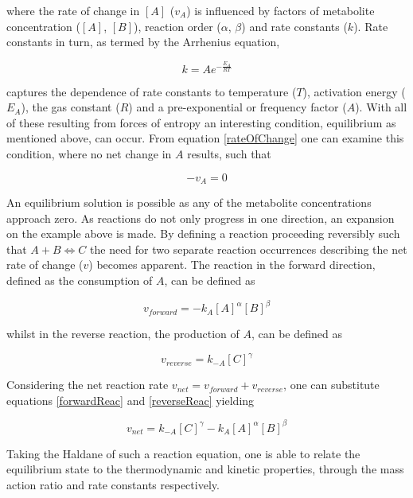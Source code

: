 where the rate of change in $[A]$  ($v_A$) is influenced by factors of metabolite concentration ($[A]$, $[B]$), reaction order ($\alpha$, $\beta$) and rate constants ($k$). Rate constants in turn, as termed by the Arrhenius equation,

\begin{equation}\label{arenius}
k = Ae^{-\frac{E_A}{RT}}
\end{equation}

captures the dependence of rate constants to temperature ($T$), activation energy ($E_A$), the gas constant ($R$) and a pre-exponential or frequency factor ($A$). With all of these resulting from forces of entropy an interesting condition, equilibrium as mentioned above, can occur. From equation \ref{rateOfChange} one can examine this condition, where no net change in $A$ results, such that

\begin{equation}
-v_A = 0
\end{equation} 

An equilibrium solution is possible as any of the metabolite concentrations approach zero. As reactions do not only progress in one direction, an expansion on the example above is made. By defining a reaction proceeding reversibly such that $A + B \Longleftrightarrow  C$ the need for two separate reaction occurrences describing the net rate of change ($v$) becomes apparent. The reaction in the forward direction, defined as the consumption of $A$, can be defined as

\begin{equation}\label{forwardReac}
    v_{forward} = -k_A[A]^\alpha[B]^\beta
\end{equation} 

whilst in the reverse reaction, the production of $A$, can be defined as 

\begin{equation}\label{reverseReac}
v_{reverse} = k_{-A}[C]^\gamma
\end{equation}

Considering the net reaction rate $v_{net} = v_{forward} + v_{reverse}$, one can substitute equations \ref{forwardReac} and \ref{reverseReac} yielding

\begin{equation}
v_{net} = k_{-A}[C]^\gamma -k_A[A]^\alpha[B]^\beta
\end{equation}

Taking the Haldane of such a reaction equation, one is able to relate the equilibrium state to the thermodynamic and kinetic properties, through the mass action ratio and rate constants respectively.

